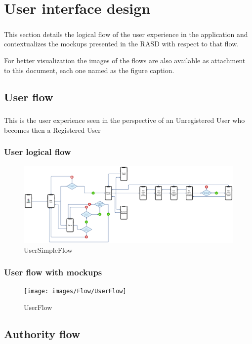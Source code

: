 	\chapter{User interface design}
		\paragraph{}
			This section details the logical flow of the user experience in the application and contextualizes the mockups presented in the RASD with respect to that flow.
			
			For better visualization the images of the flows are also available as attachment to this document, each one named as the figure caption.
		\section{User flow}
			\paragraph{}
				This is the user experience seen in the perspective of an Unregistered User who becomes then a Registered User
			\subsection{User logical flow}
			\begin{figure}[!h]
				\centering
				\includegraphics[width=\textwidth]{images/Flow/UserSimpleFlow}
				\caption{UserSimpleFlow}
			\end{figure}
			\clearpage
			\subsection{User flow with mockups}
			\begin{figure}[!h]
				\centering
				\texttt{[image: images/Flow/UserFlow]}
				\caption{UserFlow}
			\end{figure}
		\clearpage
		\section{Authority flow}
